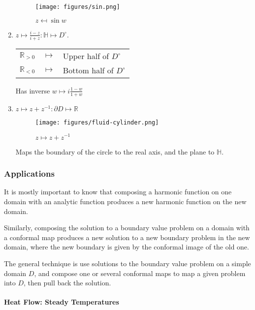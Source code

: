\begin{enumerate}
  \begin{figure}
  \centering
  \texttt{[image: figures/sin.png]}
  \caption{\(z \mapsfrom \sin w\)}
  \end{figure}
\item
  \(z\mapsto\frac{i-z}{i+z}: \mathbb{H} \mapsto D^\circ\).

  \begin{longtable}[]{@{}lcl@{}}
  \toprule
  \endhead
  \(\mathbb{R}_{>0}\) & \(\mapsto\) & Upper half of
  \(D^\circ\)\tabularnewline
  \(\mathbb{R}_{<0}\) & \(\mapsto\) & Bottom half of
  \(D^\circ\)\tabularnewline
  \bottomrule
  \end{longtable}

  Has inverse \(w \mapsto i\frac{1-w}{1+w}\)
\item
  \(z\mapsto z + z^{-1}: \partial D \mapsto \mathbb{R}\)

  \begin{figure}
  \centering
  \texttt{[image: figures/fluid-cylinder.png]}
  \caption{\(z \mapsto z+z^{-1}\)}
  \end{figure}

  Maps the boundary of the circle to the real axis, and the plane to
  \(\mathbb{H}\).
\end{enumerate}

\hypertarget{applications}{%
\subsubsection{Applications}\label{applications}}

It is mostly important to know that composing a harmonic function on one
domain with an analytic function produces a new harmonic function on the
new domain.

Similarly, composing the solution to a boundary value problem on a
domain with a conformal map produces a new solution to a new boundary
problem in the new domain, where the new boundary is given by the
conformal image of the old one.

The general technique is use solutions to the boundary value problem on
a simple domain \(D\), and compose one or several conformal maps to map
a given problem into \(D\), then pull back the solution.

\hypertarget{heat-flow-steady-temperatures}{%
\paragraph{Heat Flow: Steady
Temperatures}\label{heat-flow-steady-temperatures}}

